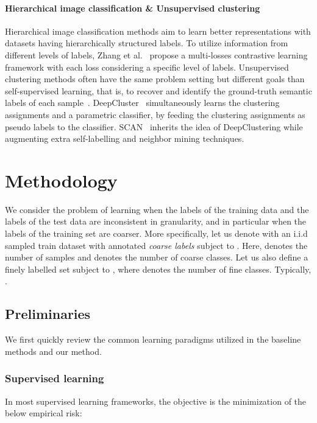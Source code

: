 \documentclass[10pt,twocolumn,letterpaper]{article}
\begin{document}
\paragraph{Hierarchical image classification \& Unsupervised clustering}
Hierarchical image classification methods aim to learn better representations with datasets having hierarchically structured labels. To utilize information from different levels of labels,  Zhang et al.~\cite{zhang2022hierarchical_alllabels} propose a multi-losses contrastive learning framework with each loss considering a specific level of labels.
Unsupervised clustering methods often have the same problem setting but different goals than self-supervised learning, that is, to recover and identify the ground-truth semantic labels of each sample~\cite{caron2018deepclustering, van2020scan}. DeepCluster~\cite{caron2018deepclustering} simultaneously learns the clustering assignments and a parametric classifier, by feeding the clustering assignments as pseudo labels to the classifier. SCAN~\cite{van2020scan} inherits the idea of DeepClustering while augmenting extra self-labelling and neighbor mining techniques.

\section{Methodology}\label{method}
We consider the problem of learning when the labels of the training data and the labels of the test data are inconsistent in granularity, and in particular when the labels of the training set are coarser. More specifically, let us denote with  an i.i.d sampled train dataset with annotated \textit{coarse labels}  subject to . Here,  denotes the number of samples and  denotes the number of coarse classes. Let us also define a finely labelled set  subject to , where  denotes the number of fine classes. Typically, . 

\subsection{Preliminaries}\label{method_pre}
We first quickly review the common learning paradigms utilized in the baseline methods and our method.
\subsubsection{Supervised learning}\label{method_pre_supervised}
In most supervised learning frameworks, the objective is the minimization of the below empirical risk:
\end{document}
